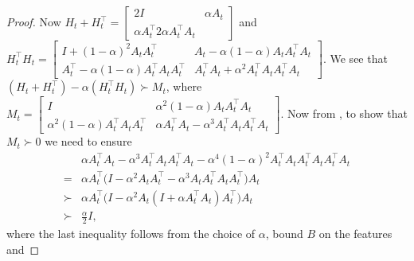 \begin{proof}
Now $H_t+H_t^\top=\left[\begin{matrix} 2I & \alpha A_t\\ \alpha A_t^\top 2\alpha A_t^\top A_t\end{matrix}\right]$ and $H_t^\top H_t=\left[\begin{matrix} I+(1-\alpha)^2A_tA_t^\top & A_t-\alpha(1-\alpha)A_tA_t^\top A_t\\ A_t^\top-\alpha(1-\alpha)A_t^\top A_t A_t^\top & A_t^\top A_t+\alpha^2A_t^\top A_t A_t^\top A_t\end{matrix}\right]$.  We see that $(H_t+H_t^\top) -\alpha(H_t^\top H_t) \succ M_t$, where $M_t=\left[\begin{matrix}I &\alpha^2(1-\alpha) A_tA_t^\top A_t\\ \alpha^2(1-\alpha) A_t^\top A_t A_t^\top &\alpha A_t^\top A_t-\alpha^3A_t^\top A_tA_t^\top A_t\end{matrix}\right]$. Now from , to show that $M_t\succ 0$ we need to ensure 
\begin{align}
&\alpha A_t^\top A_t -\alpha^3A_t^\top A_t A_t^\top A_t - \alpha^4(1-\alpha)^2A_t^\top A_t A_t^\top A_t A_t^\top A_t\\
=&\alpha A_t^\top\big(I-\alpha^2 A_tA_t^\top-\alpha^3A_tA_t^\top A_tA_t^\top\big)A_t\\
\succ &\alpha A_t^\top\big(I-\alpha^2 A_t(I+\alpha A_t^\top A_t)A_t^\top\big)A_t\\
\succ& \frac{\alpha}{2} I,
\end{align}
where the last inequality follows from the choice of $\alpha$, bound $B$ on the features and 
\end{proof}
